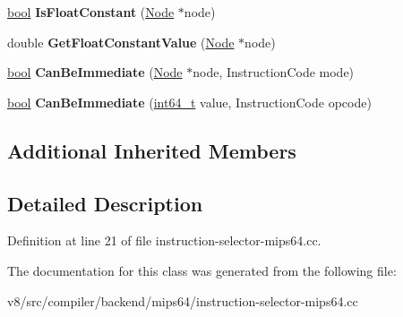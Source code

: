 \begin{DoxyCompactItemize}
\mbox{\hyperlink{classbool}{bool}} {\bfseries Is\+Float\+Constant} (\mbox{\hyperlink{classv8_1_1internal_1_1compiler_1_1Node}{Node}} $\ast$node)
\item 
\mbox{\label{classv8_1_1internal_1_1compiler_1_1Mips64OperandGenerator_a13f0e7196aa5cf0a00f15b49fbf59599}} 
double {\bfseries Get\+Float\+Constant\+Value} (\mbox{\hyperlink{classv8_1_1internal_1_1compiler_1_1Node}{Node}} $\ast$node)
\item 
\mbox{\label{classv8_1_1internal_1_1compiler_1_1Mips64OperandGenerator_a6c559016e8ccc2bcc31f6fc786de2124}} 
\mbox{\hyperlink{classbool}{bool}} {\bfseries Can\+Be\+Immediate} (\mbox{\hyperlink{classv8_1_1internal_1_1compiler_1_1Node}{Node}} $\ast$node, Instruction\+Code mode)
\item 
\mbox{\label{classv8_1_1internal_1_1compiler_1_1Mips64OperandGenerator_a993fedd0cb3760ba58b306473c7f5959}} 
\mbox{\hyperlink{classbool}{bool}} {\bfseries Can\+Be\+Immediate} (\mbox{\hyperlink{classint64__t}{int64\+\_\+t}} value, Instruction\+Code opcode)
\end{DoxyCompactItemize}
\subsection*{Additional Inherited Members}


\subsection{Detailed Description}


Definition at line 21 of file instruction-\/selector-\/mips64.\+cc.



The documentation for this class was generated from the following file\+:\begin{DoxyCompactItemize}
\item 
v8/src/compiler/backend/mips64/instruction-\/selector-\/mips64.\+cc\end{DoxyCompactItemize}
